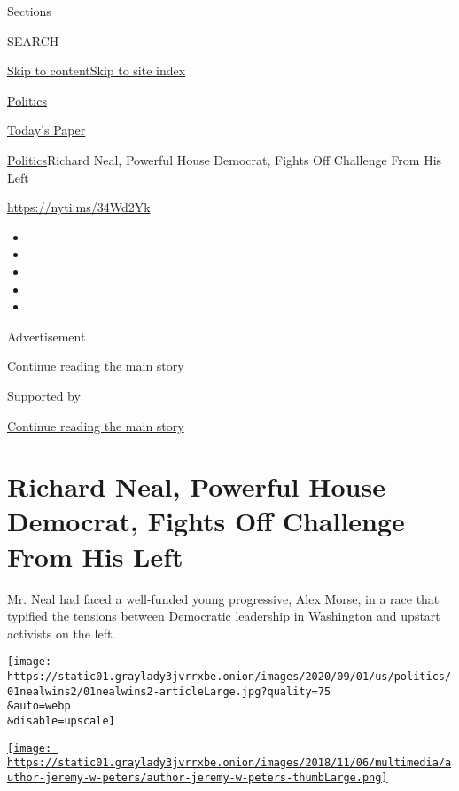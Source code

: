 Sections

SEARCH

\protect\hyperlink{site-content}{Skip to
content}\protect\hyperlink{site-index}{Skip to site index}

\href{https://www.nytimes3xbfgragh.onion/section/politics}{Politics}

\href{https://myaccount.nytimes3xbfgragh.onion/auth/login?response_type=cookie\&client_id=vi}{}

\href{https://www.nytimes3xbfgragh.onion/section/todayspaper}{Today's
Paper}

\href{/section/politics}{Politics}\textbar{}Richard Neal, Powerful House
Democrat, Fights Off Challenge From His Left

\url{https://nyti.ms/34Wd2Yk}

\begin{itemize}
\item
\item
\item
\item
\item
\end{itemize}

Advertisement

\protect\hyperlink{after-top}{Continue reading the main story}

Supported by

\protect\hyperlink{after-sponsor}{Continue reading the main story}

\hypertarget{richard-neal-powerful-house-democrat-fights-off-challenge-from-his-left}{%
\section{Richard Neal, Powerful House Democrat, Fights Off Challenge
From His
Left}\label{richard-neal-powerful-house-democrat-fights-off-challenge-from-his-left}}

Mr. Neal had faced a well-funded young progressive, Alex Morse, in a
race that typified the tensions between Democratic leadership in
Washington and upstart activists on the left.

\texttt{[image: https://static01.graylady3jvrrxbe.onion/images/2020/09/01/us/politics/01nealwins2/01nealwins2-articleLarge.jpg?quality=75\\\&auto=webp\\\&disable=upscale]}

\href{https://www.nytimes3xbfgragh.onion/by/jeremy-w-peters}{\texttt{[image: https://static01.graylady3jvrrxbe.onion/images/2018/11/06/multimedia/author-jeremy-w-peters/author-jeremy-w-peters-thumbLarge.png]}}

